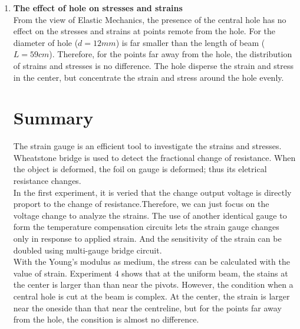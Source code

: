 \documentclass[11pt,a4paper,twoside]{article}
\begin{document}
\begin{enumerate}
\item
\textbf{The effect of hole on stresses and strains} \\
From the view of Elastic Mechanics, the presence of the central hole has no effect on the stresses and strains at points remote from the hole. For the diameter of hole ($d=12mm$) is far smaller than the length of beam ($L=59cm$). Therefore, for the points far away from the hole, the distribution of strains and stresses is no difference. The hole disperse the strain and stress in the center, but concentrate the strain and stress around the hole evenly.  \\

\pagebreak

\section{Summary}
The strain gauge is an efficient tool to investigate the strains and stresses. Wheatstone bridge is used to detect the fractional change of resistance. When the object is deformed, the foil on gauge is deformed; thus its eletrical resistance changes. \\
In the first experiment, it is veried that the change output voltage is directly proport to the change of resistance.Therefore, we can just focus on the voltage change to analyze the strains. The use of another identical gauge to form the temperature compensation circuits lets the strain gauge changes only in response to applied strain. And the sensitivity of the strain can be doubled using multi-gauge bridge circuit.\\
With the Young's modulus as medium, the stress can be calculated with the value of strain. Experiment 4 shows that at the uniform beam, the stains at the center is larger than than near the pivots. However, the condition when a central hole is cut at the beam is complex. At the center, the strain is larger near the oneside than that near the centreline, but for the points far away from the hole, the consition is almost no difference. \\


\end{enumerate}
\end{document}
